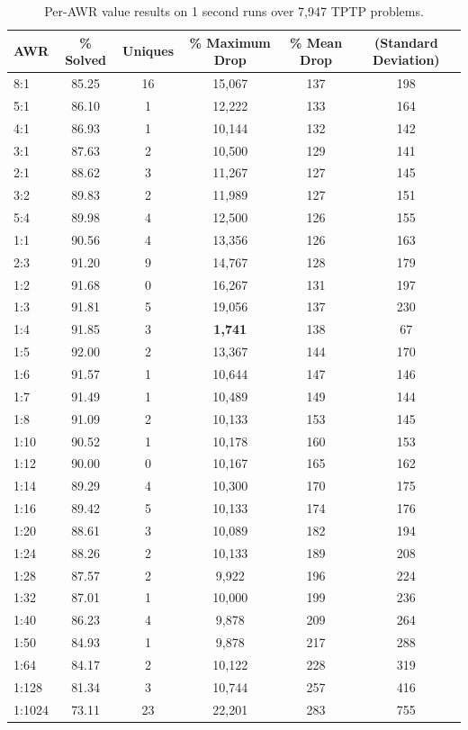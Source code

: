 \documentclass{llncs}
\begin{document}
\begin{table}[t]
	\caption{
Per-AWR value results on 1 second runs over 7,947 TPTP problems.
	}
	\centering
	\begin{tabular}{l | c | c | c | c  c }
		AWR & \% Solved & Uniques & \% Maximum Drop & \% Mean Drop & (Standard Deviation)\\
\hline
8:1 & 85.25 & 16 & 15,067 & 137 & 198\\
5:1 & 86.10 & 1 & 12,222 & 133 & 164\\
4:1 & 86.93 & 1 & 10,144 & 132 & 142\\
3:1 & 87.63 & 2 & 10,500 & 129 & 141\\
2:1 & 88.62 & 3 & 11,267 & 127 & 145\\
3:2 & 89.83 & 2 & 11,989 & 127 & 151\\
5:4 & 89.98 & 4 & 12,500 & 126 & 155\\
1:1 & 90.56 & 4 & 13,356 & 126 & 163\\
2:3 & 91.20 & 9 & 14,767 & 128 & 179\\
1:2 & 91.68 & 0 & 16,267 & 131 & 197\\
1:3 & 91.81 & 5 & 19,056 & 137 & 230\\
1:4 & 91.85 & 3 & \textbf{1,741} & 138 & 67\\
1:5 & 92.00 & 2 & 13,367 & 144 & 170\\
1:6 & 91.57 & 1 & 10,644 & 147 & 146\\
1:7 & 91.49 & 1 & 10,489 & 149 & 144\\
1:8 & 91.09 & 2 & 10,133 & 153 & 145\\
1:10& 90.52 & 1 & 10,178 & 160 & 153\\
1:12& 90.00 & 0 & 10,167 & 165 & 162\\
1:14& 89.29 & 4 & 10,300 & 170 & 175\\
1:16& 89.42 & 5 & 10,133 & 174 & 176\\
1:20& 88.61 & 3 & 10,089 & 182 & 194\\
1:24& 88.26 & 2 & 10,133 & 189 & 208\\
1:28& 87.57 & 2 & 9,922 & 196 & 224\\
1:32& 87.01 & 1 & 10,000 & 199 & 236\\
1:40& 86.23 & 4 & 9,878 & 209 & 264\\
1:50& 84.93 & 1 & 9,878 & 217 & 288\\
1:64& 84.17 & 2 & 10,122 & 228 & 319\\
1:128&81.34 & 3 & 10,744 & 257 & 416\\
1:1024&73.11 & 23 & 22,201 & 283 & 755
	\end{tabular}
	\label{tab:no-best-awr}
\end{table}
\end{document}
